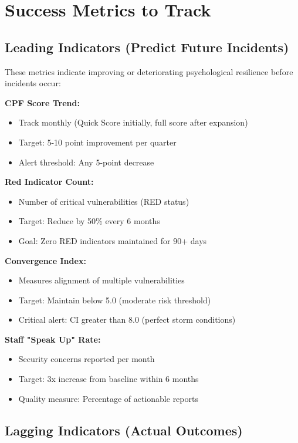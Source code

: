 \documentclass[11pt,a4paper]{article}
\begin{document}
\section{Success Metrics to Track}

\subsection{Leading Indicators (Predict Future Incidents)}

These metrics indicate improving or deteriorating psychological resilience before incidents occur:

\textbf{CPF Score Trend:}
\begin{itemize}
\item Track monthly (Quick Score initially, full score after expansion)
\item Target: 5-10 point improvement per quarter
\item Alert threshold: Any 5-point decrease
\end{itemize}

\textbf{Red Indicator Count:}
\begin{itemize}
\item Number of critical vulnerabilities (RED status)
\item Target: Reduce by 50\% every 6 months
\item Goal: Zero RED indicators maintained for 90+ days
\end{itemize}

\textbf{Convergence Index:}
\begin{itemize}
\item Measures alignment of multiple vulnerabilities
\item Target: Maintain below 5.0 (moderate risk threshold)
\item Critical alert: CI greater than 8.0 (perfect storm conditions)
\end{itemize}

\textbf{Staff "Speak Up" Rate:}
\begin{itemize}
\item Security concerns reported per month
\item Target: 3x increase from baseline within 6 months
\item Quality measure: Percentage of actionable reports
\end{itemize}

\subsection{Lagging Indicators (Actual Outcomes)}
\end{document}
